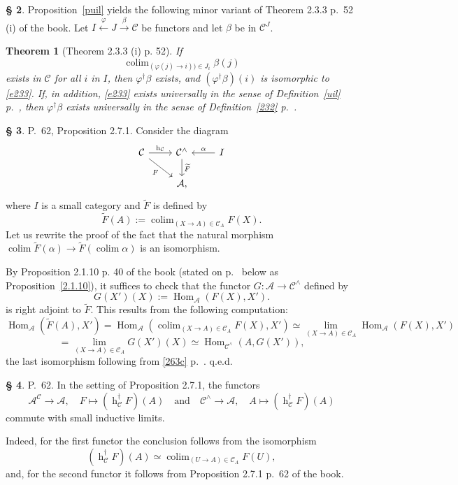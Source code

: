\documentclass[12pt]{article}
\newtheorem{thm}{Theorem}
\theoremstyle{remark}
\theoremstyle{definition}
\newtheorem{s}[thm]{\S}
\newcommand{\oo}{\operatorname}
\newcommand{\A}{\mathcal A}
\newcommand{\C}{\mathcal C}
\newcommand{\pp}{\varphi}
\newcommand{\xr}{\xrightarrow}
\DeclareMathOperator*{\colim}{colim}
\DeclareMathOperator{\hy}{h}
\DeclareMathOperator{\Hom}{Hom}
\begin{document}
\begin{s} 
Proposition~\ref{puil} yields the following minor variant of Theorem 2.3.3 p.~52 (i) of the book. Let $I\xleftarrow\pp J\xr\beta\C$ be functors and let $\beta$ be in $\C^J$. 

\begin{thm}[Theorem 2.3.3 (i) p. 52]\label{233}
If 
%
\begin{equation}\label{e233}
\colim_{(\pp(j)\to i))\in J_i}\beta(j)
\end{equation}
%
exists in $\C$ for all $i$ in $I$, then $\pp^\dagger\beta$ exists, and $(\pp^\dagger\beta)(i)$ is isomorphic to \eqref{e233}. If, in addition, \eqref{e233} exists universally in the sense of Definition~\ref{uil} p.~\pageref{uil}, then $\pp^\dagger\beta$ exists universally in the sense of Definition~\ref{232} p.~\pageref{232}. 
\end{thm}
\end{s}

%

\begin{s}\label{c271b}
P.~62, Proposition 2.7.1. Consider the diagram 
$$
\begin{tikzcd}
\C\ar{r}{\hy_\C}\ar{dr}[swap]{F}&\C^\wedge\ar{d}{\widetilde F}&I\ar{l}[swap]{\alpha}\\
&\A,
\end{tikzcd}
$$
where $I$ is a small category and $\widetilde F$ is defined by 
$$
\widetilde F(A):=\colim_{(X\to A)\in\C_A}F(X). 
$$
Let us rewrite the proof of the fact that the natural morphism $\colim\widetilde F(\alpha)\to\widetilde F\left(\colim\alpha\right)$ is an isomorphism. 

By Proposition 2.1.10 p. 40 of the book (stated on p.~\pageref{2.1.10} below as Proposition~\ref{2.1.10}), it suffices to check that the functor $G:\A\to\C^\wedge$ defined by 
$$
G(X')(X):=\Hom_{\A}(F(X),X').
$$ 
is right adjoint to $\widetilde F$. This results from the following computation: 
$$
\Hom_{\A}\left(\widetilde F(A),X'\right)=
\Hom_{\A}\left(\colim_{(X\to A)\in\C_A}F(X),X'\right)\simeq 
\lim_{(X\to A)\in\C_A}\Hom_{\A}(F(X),X')
$$
$$
=\lim_{(X\to A)\in\C_A}G(X')(X)\simeq\Hom_{\C^\wedge}(A,G(X')), 
$$ 
the last isomorphism following from \eqref{263c} p.~\pageref{263c}. q.e.d.
\end{s}

%

\begin{s}\label{bil}
P.~62. In the setting of Proposition 2.7.1, the functors
$$
\A^\C\to\A,\quad F\mapsto(\oo h_\C^\dagger F)(A)\quad\text{and}\quad
\C^\wedge\to\A,\quad A\mapsto(\oo h_\C^\dagger F)(A)
$$ 
commute with small inductive limits. 

Indeed, for the first functor the conclusion follows from the isomorphism 
$$
(\oo h_\C^\dagger F)(A)\simeq\colim_{(U\to A)\in\C_A}F(U),
$$ 
and, for the second functor it follows from Proposition 2.7.1 p.~62 of the book.
\end{s}
\end{document}
